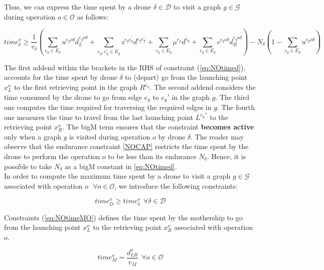 \noindent
Thus, we can express the time spent by a drone $\delta \in \mathcal D$ to visit a graph $g \in \mathcal G$ during operation $o \in \mathcal O$ as follows:

\begin{equation}
time_\delta^o \geq \frac{1}{v_\delta}\left(\sum_{e_g\in E_g} u^{e_go\delta}d_L^{e_go\delta} + \sum_{e_g, e^\prime_g\in E_g}z^{e_ge^\prime_g}d^{e_ge^\prime_g} + \sum_{e_g\in E_g} \mu^{e_g}d^{e_g} + \sum_{e_g\in E_g} v^{e_go\delta}d_R^{e_go\delta}\right) - N_\delta(1 - \sum_{e_g\in E_g} u^{e_go\delta})
\label{eq:NOtimed}
\end{equation}

\noindent
The first addend within the brackets in the RHS of constraint (\ref{eq:NOtimed}), accounts for the time spent by drone $\delta$ to (depart) go from the launching point $x_L^o$ to the first retrieving point in the graph $R^{e_g}$. The second addend considers the time consumed by the drone to go from edge $e_g$ to $e_g'$ in the graph $g$. The third one computes the time required for traversing the required edges in $g$. The fourth one measures the time to travel from the last launching point $L^{e_g''}$ to the retrieving point $x_R^o$.
The bigM term ensures that the constraint \textbf{becomes active} only when a graph $g$ is visited during operation $o$ by drone $\delta$. The reader may observe that the endurance constraint \eqref{NOCAP} restricts the time spent by the drone to perform the operation $o$ to be less than its endurance $N_\delta$. Hence, it is possible to take $N_\delta$ as a bigM constant in \eqref{eq:NOtimed}.\\


\noindent
In order to compute the maximum time spent by a drone to visit a graph $g \in \mathcal G$ associated with operation $o \:\:\ \forall o \in \mathcal O$, we introduce the following constraints:

\begin{equation}
time_D^o \geq time_\delta^o \:\: \forall \delta \in \mathcal D%
\label{eq:NOtimeD}
\end{equation}

\noindent
Constraints (\ref{eq:NOtimeMO}) defines the time spent by the mothership to go from the launching point $x_L^o$ to the retrieving point $x_R^o$ associated with operation $o$. 

\begin{equation}
time_M^o = \frac{d_{LR}^o}{v_M} \:\: \forall o \in \mathcal O
\label{eq:NOtimeMO}
\end{equation}

